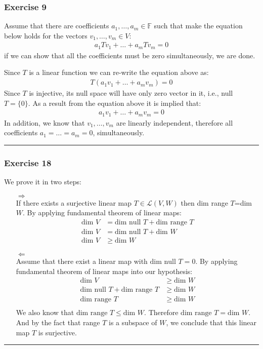 \documentclass[12pt, letterpaper]{scrartcl}
\newcommand{\F}{\mathbb{F}}
\begin{document}
\subsubsection*{Exercise 9}
Assume that there are coefficients $a_1,\dots,a_m\in \F$ such that make the equation below holds for the vectors $v_1,\dots,v_m\in V$:
\begin{align*}
    a_1Tv_1+\dots+a_mTv_m=0
\end{align*}
if we can show that all the coefficients must be zero simultaneously, we are done.

Since $T$ is a linear function we can re-write the equation above as:
\begin{align*}
    T(a_1v_1+\dots+a_mv_m)=0
\end{align*}
Since $T$ is injective, its null space will have only zero vector in it, i.e., null $T=\{0\}$. As a result from the equation above it is implied that:
\begin{align*}
    a_1v_1+\dots+a_mv_m=0
\end{align*}
In addition, we know that $v_1,\dots, v_m$ are linearly independent, therefore all coefficients $a_1=\dots=a_m=0$, simultaneously.
\vskip1mm\hrule

\subsubsection*{Exercise 18}
We prove it in two steps:
\begin{itemize}
    \item[$\Longrightarrow$]\mbox{}\\
    If there exists a surjective linear map $T\in\mathcal{L}(V,W)$ then dim range $T$=dim $W$. By applying fundamental theorem of linear maps:
    \begin{align*}
        \text{dim }V&= \text{dim null }T + \text{dim range }T\\
        \text{dim }V&= \text{dim null }T + \text{dim }W\\
        \text{dim }V&\geq \text{dim }W
    \end{align*}
    
    \item[$\Longleftarrow$]\mbox{}\\
    Assume that there exist a linear map with $\text{dim null }T = 0$.
    By applying fundamental theorem of linear maps into our hypothesis:
    \begin{align*}
        \text{dim }V &\geq \text{dim }W\\
        \text{dim null }T + \text{dim range }T&\geq \text{dim }W\\
        \text{dim range }T&\geq \text{dim }W\\
    \end{align*}
    We also know that $\text{dim range }T\leq \text{dim }W$. Therefore $\text{dim range }T=\text{dim }W$. And by the fact that range $T$ is a subspace of $W$, we conclude that this linear map $T$ is surjective.

\end{itemize}
\vskip1mm\hrule
\end{document}
